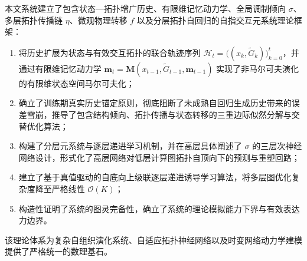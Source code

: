 \documentclass[11pt,a4paper]{article}
\numberwithin{equation}{section}
\theoremstyle{definition}
\theoremstyle{remark}
\begin{document}
	本文系统建立了包含状态—拓扑增广历史、有限维记忆动力学、全局调制倾向 $\sigma$、多层拓扑传播链 $\eta$、微观物理转移 $f$ 以及分层拓扑自回归的自指交互元系统理论框架：
	\begin{enumerate}[label=(\arabic*), leftmargin=2.4em]
		\item 将历史扩展为状态与有效交互拓扑的联合轨迹序列 $\mathcal{H}_t = \big( (x_k, \widetilde{G}_k) \big)_{k=0}^t$，并通过有限维记忆动力学 $\mathbf{m}_t = \mathbf{M}(x_{t-1}, \widetilde{G}_{t-1}, \mathbf{m}_{t-1})$ 实现了非马尔可夫演化的有限维状态空间马尔可夫化；
		\item 确立了训练期真实历史锚定原则，彻底阻断了未成熟自回归生成历史带来的误差雪崩，推导了包含结构倾向、拓扑传播与状态转移的三重边际似然分解与交替优化算法；
		\item 构建了分层元系统与逐层递进学习机制，并在高层具体阐述了 $\sigma$ 的三层次神经网络设计，形式化了高层网络对低层计算图拓扑自顶向下的预测与重塑回路；
		\item 建立了基于真值驱动的自底向上级联逐层递进诱导学习算法，将多层图优化复杂度降至严格线性 $\mathcal{O}(K)$；
		\item 构造性证明了系统的图灵完备性，确立了系统的理论模拟能力下界与有效表达力边界。
	\end{enumerate}
	该理论体系为复杂自组织演化系统、自适应拓扑神经网络以及时变网络动力学建模提供了严格统一的数理基石。
	
\end{document}
